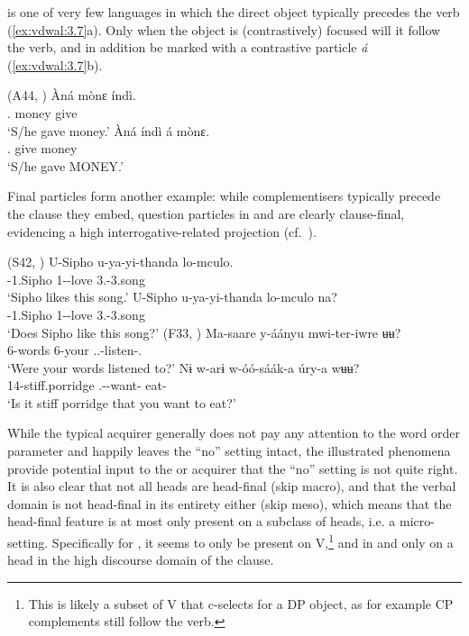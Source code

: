 \documentclass[output=paper]{langsci/langscibook}
\begin{document}
 is one of very few  languages in which the direct object typically
precedes the verb (\ref{ex:vdwal:3.7}a). Only when the object is (contrastively)
focused will it follow the verb, and in addition be marked with a contrastive
particle \emph{á} (\ref{ex:vdwal:3.7}b).

\ea\label{bkm:Ref373494395}\label{ex:vdwal:3.7} (A44, \citealt[126]{Mous1997})
    \ea
    \gll 	\`{A}ná  mònɛ  índì.\\
            \Tsg{}.\Pst{}  money  give\\
    \glt    \enquote*{S/he gave money.}
    \ex
    \gll 	\`{A}ná  índì  á  mònɛ.\\
            \Tsg{}.\Pst{}  give  \Ptcl{}  money\\
    \glt    \enquote*{S/he gave MONEY.}
    \z
\z

Final particles form another example: while complementisers typically precede
the clause they embed, question particles in  and  are clearly
clause-final, evidencing a high interrogative-related projection (cf.\
\citealt{Buell2005,Buell2011}).

\ea\label{ex:vdwal:3.8} (S42, \citealt[69]{Buell2005})
	\ea
	\gll	U-Sipho  u-ya-yi-thanda  lo-mculo.\\
            \Aug-1.Sipho  1\Sm-\Om{}-love  3.\Dem{}-3.song\\
	\glt    ‘Sipho likes this song.’
	\ex
	\gll	 U-Sipho  u-ya-yi-thanda  lo-mculo  na?\\
            \Aug-1.Sipho  1\Sm-\Om{}-love  3.\Dem{}-3.song  \glossQ{}\\
	\glt    ‘Does Sipho like this song?’
    \z
\ex {} (F33, \citealt[51]{Gibson2012})
    \ea
	\gll	 Ma-saare  y-áányu  mwi-ter-iwre  ʉʉ?\\
            6-words  6-your  \Spl.\Sm{}.\Pst{}-listen-\Pfv.\Pass{}  \glossQ{}\\
	\glt    ‘Were your words listened to?’
	\ex
	\gll	 Nɨ  w-arɨ  w-óó-sáák-a  úry-a  wʉʉ?\\
            \Cop{}  14-stiff.porridge  \Ssg.\Sm-\Prog{}-want-\Fv{}  eat-\Fv{}  \glossQ{}\\
    \glt    ‘Is it stiff porridge that you want to eat?’
	\z
\z

While the typical  acquirer generally does not pay any attention to the
word order parameter and happily leaves the \enquote{no} setting intact, the
illustrated phenomena provide potential input to the \ili{Rangi} or  acquirer
that the \enquote{no} setting is not quite right. It is also clear that not all heads
are head-final (skip macro), and that the verbal domain is not head-final in
its entirety either (skip meso), which means that the head-final feature is at
most only present on a subclass of heads, i.e. a micro-setting. Specifically
for \ili{Tunen}, it seems to only be present on V,\footnote{This is likely a subset
of V that c-selects for a DP object, as for example CP complements still follow
the verb.} and in \ili{Rangi} and \ili{Zulu} only on a head in the high discourse domain of
the clause.
\end{document}
